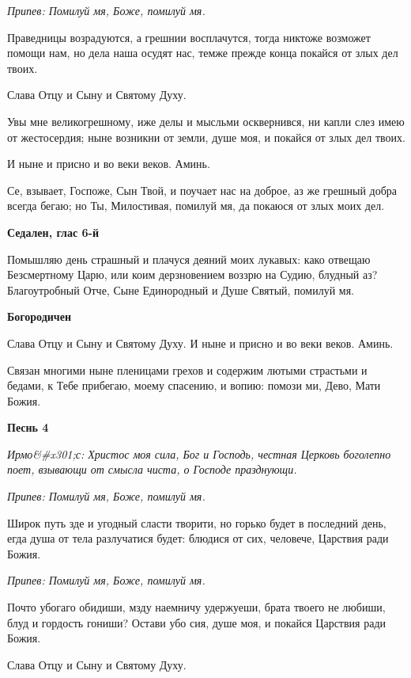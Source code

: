 \itshape Припев:\normalfont{} Помилуй мя, Боже, помилуй мя.


Праведницы возрадуются, а грешнии восплачутся, тогда никтоже возможет помощи нам, но дела наша осудят нас, темже прежде конца покайся от злых дел твоих.


Слава Отцу и Сыну и Святому Духу.


Увы мне великогрешному, иже делы и мысльми осквернився, ни капли слез имею от жестосердия; ныне возникни от земли, душе моя, и покайся от злых дел твоих.


И ныне и присно и во веки веков. Аминь.


Се, взывает, Госпоже, Сын Твой, и поучает нас на доброе, аз же грешный добра всегда бегаю; но Ты, Милостивая, помилуй мя, да покаюся от злых моих дел.




\bfseries Седален, глас 6-й\normalfont{}


Помышляю день страшный и плачуся деяний моих лукавых: како отвещаю Безсмертному Царю, или коим дерзновением воззрю на Судию, блудный аз? Благоутробный Отче, Сыне Единородный и Душе Святый, помилуй мя.




\bfseries Богородичен\normalfont{}


Слава Отцу и Сыну и Святому Духу. И ныне и присно и во веки веков. Аминь.


Связан многими ныне пленицами грехов и содержим лютыми страстьми и бедами, к Тебе прибегаю, моему спасению, и вопию: помози ми, Дево, Мати Божия.




\bfseries Песнь 4\normalfont{}


\itshape Ирмо&#x301;с:\normalfont{} Христос моя сила, Бог и Господь, честная Церковь боголепно поет, взывающи от смысла чиста, о Господе празднующи.


\itshape Припев:\normalfont{} Помилуй мя, Боже, помилуй мя.


Широк путь зде и угодный сласти творити, но горько будет в последний день, егда душа от тела разлучатися будет: блюдися от сих, человече, Царствия ради Божия.


\itshape Припев:\normalfont{} Помилуй мя, Боже, помилуй мя.


Почто убогаго обидиши, мзду наемничу удержуеши, брата твоего не любиши, блуд и гордость гониши? Остави убо сия, душе моя, и покайся Царствия ради Божия.


Слава Отцу и Сыну и Святому Духу.


